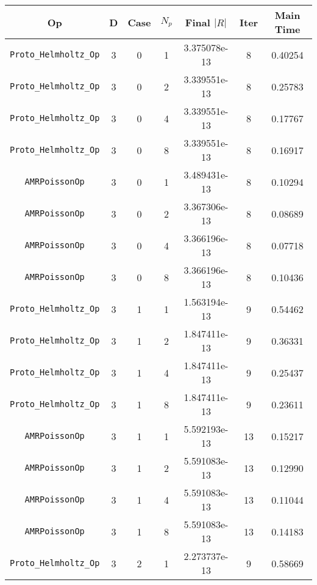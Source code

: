 \documentclass{article}
\begin{document}
\begin{small}
\begin{table}
\begin{center}
\begin{tabular}{|c|c|c|c|c|c||c|} \hline
 Op & D & Case & $N_p$ & Final $|R|$  &  Iter & Main Time \\
\hline
 {\tt Proto\_Helmholtz\_Op} & 3 & 0  & 1    & 3.375078e-13   & 8   & 0.40254    \\
 {\tt Proto\_Helmholtz\_Op} & 3 & 0  & 2    & 3.339551e-13   & 8   & 0.25783    \\
 {\tt Proto\_Helmholtz\_Op} & 3 & 0  & 4    & 3.339551e-13   & 8   & 0.17767    \\
 {\tt Proto\_Helmholtz\_Op} & 3 & 0  & 8    & 3.339551e-13   & 8   & 0.16917    \\
\hline                                                            
 {\tt AMRPoissonOp}         & 3 & 0  & 1    & 3.489431e-13   & 8   & 0.10294    \\
 {\tt AMRPoissonOp}         & 3 & 0  & 2    & 3.367306e-13   & 8   & 0.08689    \\
 {\tt AMRPoissonOp}         & 3 & 0  & 4    & 3.366196e-13   & 8   & 0.07718    \\
 {\tt AMRPoissonOp}         & 3 & 0  & 8    & 3.366196e-13   & 8   & 0.10436    \\
\hline                                                              
 {\tt Proto\_Helmholtz\_Op} & 3 & 1  & 1    & 1.563194e-13   & 9   & 0.54462    \\
 {\tt Proto\_Helmholtz\_Op} & 3 & 1  & 2    & 1.847411e-13   & 9   & 0.36331    \\
 {\tt Proto\_Helmholtz\_Op} & 3 & 1  & 4    & 1.847411e-13   & 9   & 0.25437    \\
 {\tt Proto\_Helmholtz\_Op} & 3 & 1  & 8    & 1.847411e-13   & 9   & 0.23611    \\
\hline                                                            
 {\tt AMRPoissonOp}         & 3 & 1  & 1    & 5.592193e-13   & 13  & 0.15217   \\
 {\tt AMRPoissonOp}         & 3 & 1  & 2    & 5.591083e-13   & 13  & 0.12990   \\
 {\tt AMRPoissonOp}         & 3 & 1  & 4    & 5.591083e-13   & 13  & 0.11044   \\
 {\tt AMRPoissonOp}         & 3 & 1  & 8    & 5.591083e-13   & 13  & 0.14183   \\
\hline                                                            
 {\tt Proto\_Helmholtz\_Op} & 3 & 2  & 1    & 2.273737e-13   & 9   & 0.58669   \\

\end{tabular}
\end{center}
\end{table}
\end{small}
\end{document}
